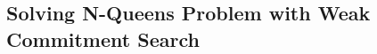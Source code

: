 \documentclass[../ThesisDoc]{subfiles}
\begin{document}
\providecommand{\rootdir}{..}


\subsection{Solving N-Queens Problem with Weak Commitment Search}
\label{sec:N-Queens-WCS}
\end{document}
